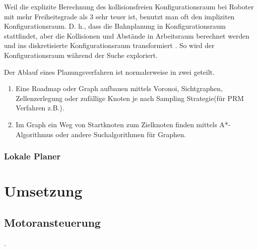 Weil die explizite Berechnung des kollisionsfreien Konfigurationsraum bei Roboter mit mehr Freiheitsgrade als 3 sehr teuer ist, benutzt man oft den impliziten Konfigurationsraum. D. h., dass die Bahnplanung in Konfigurationsraum stattfindet, aber die Kollisionen und Abstände in Arbeitsraum berechnet werden und ins diskretisierte Konfigurationsraum transformiert \citep{innoKonz}. So wird der Konfigurationsraum während der Suche exploriert.

Der Ablauf eines Planungsverfahren ist normalerweise in zwei geteilt\cite{Russell2003}.
\begin{enumerate}
\item Eine Roadmap oder Graph aufbauen mittels \gls{Voronoi}, \gls{Sichtgraphen}, \gls{Zellenzerlegung} oder zufällige Knoten je nach Sampling Strategie(für \gls{PRM} Verfahren\cite{Thrun2005} z.B.).
\item Im Graph ein Weg von Startknoten zum Zielknoten finden mittels A*-Algorithmus oder andere Suchalgorithmen für Graphen.
\end{enumerate}

\subsubsection{Lokale Planer}
\label{bahnplanung_lokale_planer_sec}





\section{Umsetzung}
\label{bahnplanung_umsetzung_sec}


\subsection{Motoransteuerung}
\label{bahnplanung_motoansteuerung_subsec}
\authorsection{\editoroier}

.

